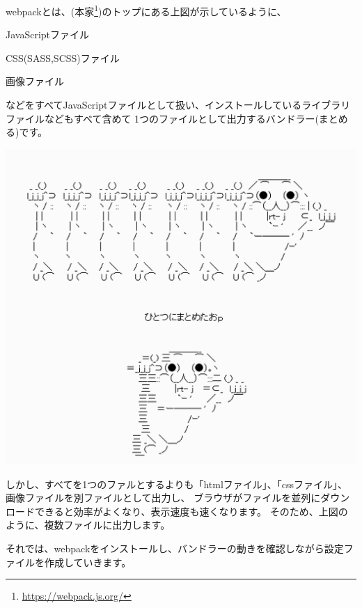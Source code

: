 webpackとは、(本家\footnote{\url{https://webpack.js.org/}})のトップにある上図が示しているように、

\begin{starteritemize}
\item JavaScriptファイル
\item CSS(SASS,SCSS)ファイル
\item 画像ファイル
\end{starteritemize}

などをすべてJavaScriptファイルとして扱い、インストールしているライブラリファイルなどもすべて含めて
1つのファイルとして出力するバンドラー(まとめる)です。

\begin{reviewimage}[H]%
\includegraphics[width=0.7\maxwidth]{./images/02-create-react-app/bandle.png}%
\label{image:02-create-react-app:bandle}
\end{reviewimage}
\vspace*{\baselineskip}

しかし、すべてを1つのファルとするよりも「htmlファイル」、「cssファイル」、画像ファイルを別ファイルとして出力し、
ブラウザがファイルを並列にダウンロードできると効率がよくなり、表示速度も速くなります。
そのため、上図のように、複数ファイルに出力します。

\vspace*{\baselineskip}

それでは、webpackをインストールし、バンドラーの動きを確認しながら設定ファイルを作成していきます。

